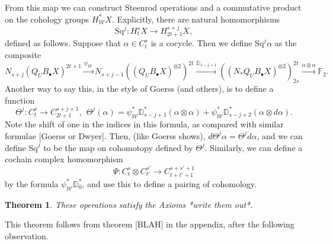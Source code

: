 \documentclass[11pt]{amsart}
\theoremstyle{plain}
\newtheorem{thm}{Theorem}[section]
\theoremstyle{definition}
\renewcommand{\to}{\longrightarrow}
\newcommand{\calW}{\mathcal{W}}
\theoremstyle{plain}
\newcommand{\Sq}{\mathrm{Sq}}
\newcommand{\F}{\mathbb{F}}
\begin{document}
\begin{Cohomology operations for unstable Lie algebras over P}
{From this map we can construct Steenrod operations and a commutative product on the cohology groups $H^*_\calW X$. Explicitly, there are natural homomorphisms
\[\Sq^j:H_t^{s}X\to H_{2t+1}^{s+j}X,\]
defined as follows. Suppose that $\alpha\in C_t^{s}$ is a cocycle. Then we define $\Sq^j\alpha$ as the composite
\[N_{s+j}(Q_UB_{\bullet}X)^{2t+1}\overset{\psi_\calW}{\to}N_{s+j-1}((Q_UB_{\bullet}X)^{\otimes2})^{2t}\overset{\mathbb{D}_{s-j+1}}{\to}
((N_*Q_UB_{\bullet}X)^{\otimes2})^{2t}_{2s}\overset{\alpha\otimes\alpha}{\to}\F_2.
\]
Another way to say this, in the style of Goerss (and others), is to define a function
\[\Theta^j:C_{t}^{s}\to C_{2t+1}^{s+j+1},\ \ \Theta^j(\alpha)=\psi^*_\calW\mathbb{D}_{s-j+1}^*(\alpha\otimes\alpha)+ \psi^*_\calW\mathbb{D}_{s-j+2}^*(\alpha\otimes d\alpha).\]
Note the shift of one in the indices in this formula, as compared with similar formulae [Goerss or Dwyer].
Then, (like Goerss shows), $d\Theta^j\alpha=\Theta^jd\alpha$, and we can define $\Sq^j$ to be the map on cohomotopy defined by $\Theta^j$. Similarly, we can define a cochain complex homomorphism
\[\Psi:C_t^{s}\otimes C_{t'}^{s'}\to C_{t+t'+1}^{s+s'+1}\]
by the formula $\psi^*_\calW\mathbb{D}_0^*$, and use this to define a pairing of cohomology.}
\begin{thm}
These operations satisfy the Axioms *write them out*.
\end{thm}
This theorem follows from theorem [BLAH] in the appendix, after the following observation. 


\end{Cohomology operations for unstable Lie algebras over P}
\end{document}
